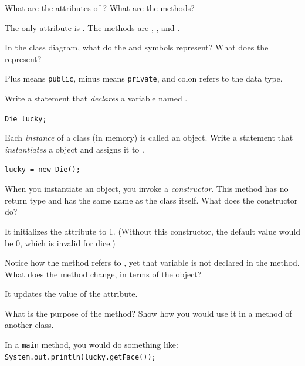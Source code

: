 

\Q What are the attributes of ? What are the methods?

\begin{answer}
The only attribute is . The methods are , , and .
\end{answer}


\Q In the class diagram, what do the \java{-} and \java{+} symbols represent? What does the \java{:} represent?

\begin{answer}
Plus means {\tt public}, minus means {\tt private}, and colon refers to the data type.
\end{answer}


\Q \label{dievar}
Write a statement that \emph{declares} a  variable named .

\begin{answer}
\tt Die lucky;
\end{answer}


\Q Each \emph{instance} of a class (in memory) is called an object. Write a statement that \emph{instantiates} a   object and assigns it to .

\begin{answer}
\tt lucky = new Die();
\end{answer}


\Q When you instantiate an object, you invoke a \emph{constructor}.
This method has no return type and has the same name as the class itself. What does the  constructor do?

\begin{answer}
It initializes the  attribute to 1.
(Without this constructor, the default value would be 0, which is invalid for dice.)
\end{answer}


\Q Notice how the  method refers to , yet that variable is not declared in the method. What does the  method change, in terms of the  object?

\begin{answer}
It updates the value of the  attribute.
\end{answer}


\Q What is the purpose of the  method? Show how you would use it in a  method of another class.

\begin{answer}
In a {\tt main} method, you would do something like: {\tt System.out.println(lucky.getFace());}
\end{answer}
